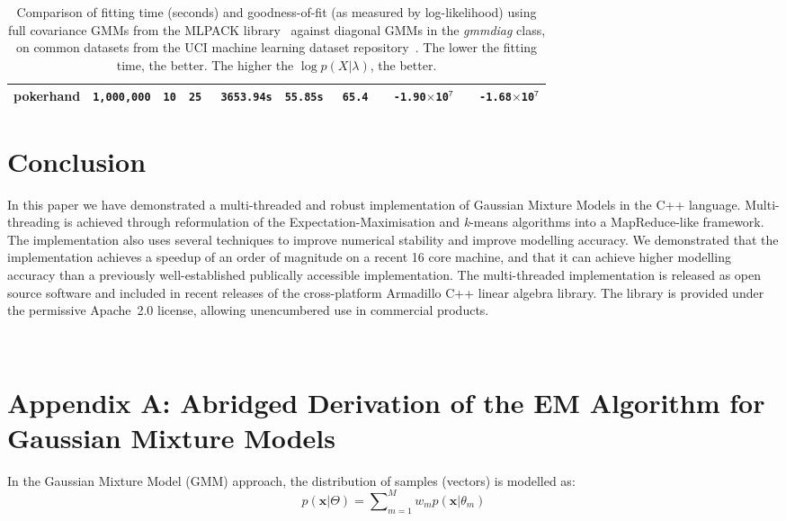 \documentclass[10pt,a4paper]{article}
\def\_{{\tt\char95}}
\def\Vec#1{{\boldsymbol{#1}}}
\begin{document}
\begin{table}[!tb]
\begin{tabular}{|l|c|c|c|c|c|c|c|c|}
  pokerhand   & {\tt 1,000,000} & {\tt 10} & {\tt 25} & {\tt ~3653.94s} &  {\tt\bfseries 55.85s} & {\tt ~65.4} & {\tt~~-1.90{\tiny$\times$}10$^{\mathtt 7}$} & {\tt\bfseries ~~-1.68{\tiny$\times$}10$^{\mathtt 7}$} \\
\hline
\end{tabular}
\vspace{1ex}
\caption
  {
  Comparison of fitting time (seconds) and goodness-of-fit (as measured by log-likelihood) using full covariance GMMs from the MLPACK library~\cite{Curtin_2013}
  against diagonal GMMs in the {\it gmm\_diag} class,
  on common datasets from the UCI machine learning dataset repository~\cite{Lichman_2013}.
  The lower the fitting time, the better.
  The higher the $\log p(X|\lambda)$, the better.
  }
\label{tab:results}
\end{table}



\section{Conclusion}

In this paper we have demonstrated a multi-threaded and robust implementation
of Gaussian Mixture Models in the C++ language.
Multi-threading is achieved through reformulation of the Expectation-Maximisation and {\it k}-means algorithms into a MapReduce-like framework.
The implementation also uses several techniques to improve numerical stability and improve modelling accuracy.
We demonstrated that the implementation achieves a speedup of an order of magnitude on a recent 16 core machine,
and that it can achieve higher modelling accuracy than a previously well-established publically accessible implementation.
The multi-threaded implementation is released as open source software
and included in recent releases of the cross-platform Armadillo C++ linear algebra library.
The library is provided under the permissive Apache~2.0 license, allowing unencumbered use in commercial products.


~

\appendix
\section*{Appendix A: Abridged Derivation of the EM Algorithm for Gaussian Mixture Models}
\label{app:em_algorithm}

In the Gaussian Mixture Model (GMM) approach, the distribution of samples (vectors) is modelled as:
%
\begin{equation}
	p(\Vec{x} | \Theta) = \sum\nolimits_{m=1}^{M} w_m p(\Vec{x}| \theta_m)
	\label{eqn:mixture_fn}
\end{equation}
\end{document}
